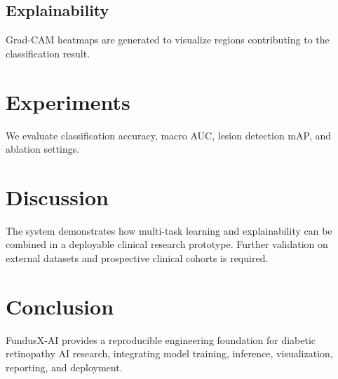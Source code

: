 \documentclass[conference]{IEEEtran}
\begin{document}
\subsection{Explainability}
Grad-CAM heatmaps are generated to visualize regions contributing to the classification result.

\section{Experiments}
We evaluate classification accuracy, macro AUC, lesion detection mAP, and ablation settings.



\section{Discussion}
The system demonstrates how multi-task learning and explainability can be combined in a deployable clinical research prototype. Further validation on external datasets and prospective clinical cohorts is required.

\section{Conclusion}
FundusX-AI provides a reproducible engineering foundation for diabetic retinopathy AI research, integrating model training, inference, visualization, reporting, and deployment.



\end{document}

